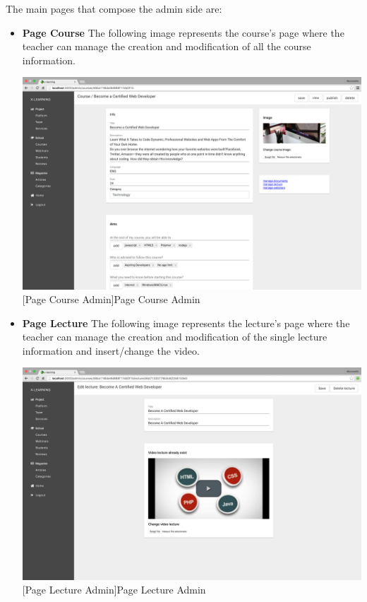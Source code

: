 The main pages that compose the admin side are:

\begin{itemize}
\item \textbf{Page Course} The following image represents the course's page where the teacher can manage the creation and modification of all the course information.\par

\begin{minipage}{\linewidth}
    \centering
    \includegraphics[width=0.9\linewidth]{images/chapter4/page-course-admin.png}
    [Page Course Admin]{Page Course Admin}
\end{minipage}

\item \textbf{Page Lecture} The following image represents the lecture's page where the teacher can manage the creation and modification of the single lecture information and insert/change the video.
\\
\par

\begin{minipage}{\linewidth}
    \centering
    \includegraphics[width=0.9\linewidth]{images/chapter4/page-lecture-admin.png}
    [Page Lecture Admin]{Page Lecture Admin}
\end{minipage}


\end{itemize}
